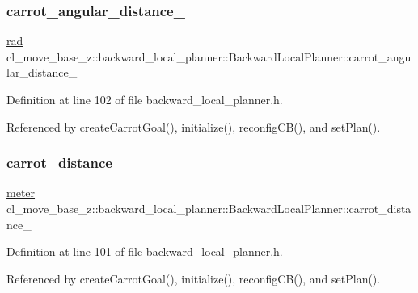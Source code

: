 \subsubsection{\texorpdfstring{carrot\+\_\+angular\+\_\+distance\+\_\+}{carrot\_angular\_distance\_}}
{\footnotesize\ttfamily \hyperlink{backward__local__planner_8h_a640effbe91ae9b25d698a883a9e80d96}{rad} cl\+\_\+move\+\_\+base\+\_\+z\+::backward\+\_\+local\+\_\+planner\+::\+Backward\+Local\+Planner\+::carrot\+\_\+angular\+\_\+distance\+\_\+\hspace{0.3cm}{\ttfamily [private]}}



Definition at line 102 of file backward\+\_\+local\+\_\+planner.\+h.



Referenced by create\+Carrot\+Goal(), initialize(), reconfig\+C\+B(), and set\+Plan().

\mbox{\label{classcl__move__base__z_1_1backward__local__planner_1_1BackwardLocalPlanner_a0bbb80ce5bae865c4322869422803296}} 
\subsubsection{\texorpdfstring{carrot\+\_\+distance\+\_\+}{carrot\_distance\_}}
{\footnotesize\ttfamily \hyperlink{backward__local__planner_8h_ab6024a26b088c11b8a5218a469ae5a57}{meter} cl\+\_\+move\+\_\+base\+\_\+z\+::backward\+\_\+local\+\_\+planner\+::\+Backward\+Local\+Planner\+::carrot\+\_\+distance\+\_\+\hspace{0.3cm}{\ttfamily [private]}}



Definition at line 101 of file backward\+\_\+local\+\_\+planner.\+h.



Referenced by create\+Carrot\+Goal(), initialize(), reconfig\+C\+B(), and set\+Plan().

